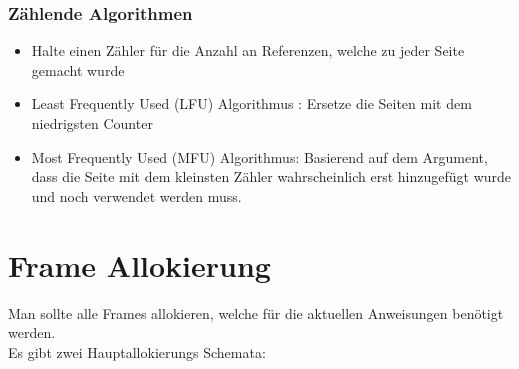 \documentclass[a4paper]{scrreprt}
\begin{document}
\subsubsection{Zählende Algorithmen}
\begin{itemize}
\item Halte einen Zähler für die Anzahl an Referenzen, welche zu jeder Seite gemacht  wurde
\item Least Frequently Used (LFU) Algorithmus : Ersetze die Seiten mit dem niedrigsten Counter
\item Most Frequently Used (MFU) Algorithmus: Basierend auf dem Argument, dass die Seite mit dem kleinsten Zähler wahrscheinlich erst hinzugefügt wurde und noch verwendet werden muss.
\end{itemize}



\section{Frame Allokierung}

Man sollte alle Frames allokieren, welche für die aktuellen Anweisungen benötigt werden.\ \\
Es gibt zwei Hauptallokierungs Schemata:
\end{document}
